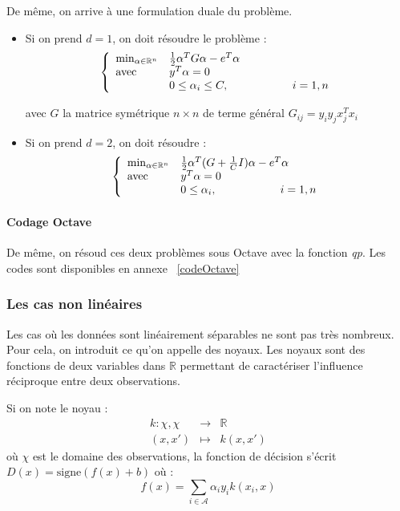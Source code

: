 \bigskip
De même, on arrive à une formulation duale du problème. 
\begin{itemize}
	\item Si on prend $d=1$, on doit résoudre le problème :
		\[\left\{\begin{array}{l l}
		\min_{\alpha\in\mathbb{R}^n} & \frac{1}{2} \alpha^TG\alpha -e^T\alpha\\
		\text{avec } & y^T\alpha=0\\
			& 0\leq \alpha_i\leq C, \hspace{2cm} i=1,n
		\end{array}\right.\]

	avec $G$ la matrice symétrique $n\times n$ de terme général $G_{ij}=y_iy_jx_j^Tx_i$

	\item Si on prend $d=2$, on doit résoudre :
		\[\left\{\begin{array}{l l}
		\min_{\alpha\in\mathbb{R}^n} & \frac{1}{2} \alpha^T(G+\frac{1}{C}I)\alpha -e^T\alpha\\
		\text{avec } & y^T\alpha=0\\
			& 0\leq \alpha_i, \hspace{2cm} i=1,n
		\end{array}\right.\]
\end{itemize}

\paragraph{Codage Octave\\}
De même, on résoud ces deux problèmes sous Octave avec la fonction \textit{qp}. Les codes sont disponibles en annexe ~\ref{codeOctave}

\subsubsection{Les cas non linéaires}
Les cas où les données sont linéairement séparables ne sont pas très nombreux. Pour cela, on introduit ce qu'on appelle des noyaux. 
Les noyaux sont des fonctions de deux variables dans $\mathbb{R}$ permettant de caractériser l'influence réciproque entre deux observations.

\bigskip
Si on note le noyau : 
\begin{eqnarray*}
	k:\chi,\chi &\to& \mathbb{R}\\
		(x,x') &\mapsto& k(x,x')
\end{eqnarray*}
où $\chi$ est le domaine des observations, la fonction de décision s'écrit $D(x)=\text{signe}(f(x)+b)$ où :
\[f(x)=\sum_{i\in\mathcal{A}} \alpha_i y_i k(x_i,x)\]

